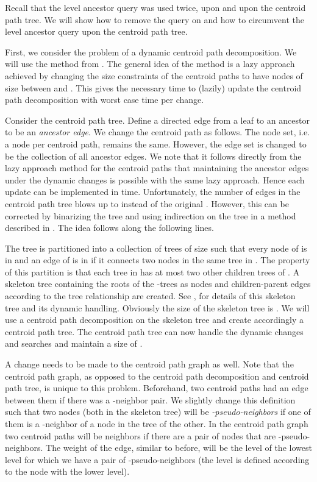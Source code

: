 \documentclass[11pt]{article}
\begin{document}
Recall that the level ancestor query was used twice, upon  and upon
the centroid path tree. We will show how to remove the query on  and how to
circumvent the level ancestor query upon the centroid path tree.

First, we consider the problem of a dynamic centroid path decomposition.
We will use the method from \cite{CoGo06,CoHa05,KoLe07}.
The general idea of the method is a lazy approach
achieved by changing the size constraints of the centroid paths to have
nodes of size between  and . This gives the necessary
time to (lazily) update the centroid path decomposition with worst case
 time per change.

Consider the centroid path tree. Define a directed edge from a leaf to an
ancestor to be an {\em ancestor edge}. We change the centroid path as
follows. The node set, i.e. a node per centroid path, remains the same.
However, the edge set is changed to be the collection of all ancestor
edges. We note that it follows directly from the lazy approach method for
the centroid paths that maintaining the ancestor edges under the dynamic
changes is possible with the same lazy approach. Hence each update can be
implemented in  time. Unfortunately, the number of edges in the
centroid path tree blows up to  instead of the original .
However, this can be corrected by binarizing the tree  and using
indirection on the tree in a method described in \cite{CoHa05,KoLe07}. The
idea follows along the following lines.

The tree  is partitioned into a collection of trees  of size
 such that every node of  is in  and an edge of  is
in  if it connects two nodes in the same tree in . The property of
this partition is that each tree in  has at most two other children
trees of . A skeleton tree  containing the roots of the
-trees as nodes and children-parent edges according to the  tree
relationship are created. See \cite[Section 6]{KoLe07}, for
details of this skeleton tree and its dynamic handling. Obviously the
size of the skeleton tree is . We will use a centroid path
decomposition on the skeleton tree and create accordingly a centroid path
tree. The centroid path tree can now handle the dynamic changes and
searches and maintain a size of .

A change needs to be made to the
centroid path graph as well. Note that the centroid path graph, as opposed to
the centroid path decomposition and centroid path tree, is unique to this problem.
Beforehand, two centroid paths had an edge
between them if there was a -neighbor pair. We slightly change this
definition such that two nodes (both in the skeleton tree) will be {\em
-pseudo-neighbors} if one of them is a -neighbor of a node in the 
tree of the other. In the centroid path graph two centroid paths will be
neighbors if there are a pair of nodes that are -pseudo-neighbors. The
weight of the edge, similar to before, will be the level of the lowest
level for which we have a pair of -pseudo-neighbors (the level is defined according to the node
with the lower level).
\end{document}
